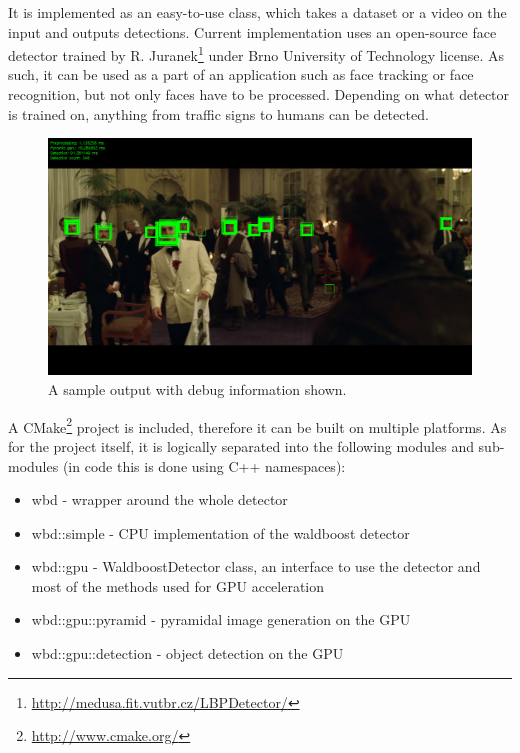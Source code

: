 It is implemented as an easy-to-use class, which takes a dataset or a video on the input and outputs detections. Current implementation uses an open-source face detector trained by R. Juranek\footnote{\url{http://medusa.fit.vutbr.cz/LBPDetector/}} under Brno University of Technology license. As such, it can be used as a part of an application such as face tracking or face recognition, but not only faces have to be processed. Depending on what detector is trained on, anything from traffic signs to humans can be detected.

\begin{center}
\begin{figure}[ht]
	\centering\includegraphics[width=\textwidth]{fig/sample.jpg}
	\caption{A sample output with debug information shown.}
	\label{fig:sample}
\end{figure}
\end{center}

A CMake\footnote{\url{http://www.cmake.org/}} project is included, therefore it can be built on multiple platforms. As for the project itself, it is logically separated into the following modules and sub-modules (in code this is done using C++ namespaces):

\begin{itemize}
	\item wbd - wrapper around the whole detector
	\item wbd::simple - CPU implementation of the waldboost detector
	\item wbd::gpu - WaldboostDetector class, an interface to use the detector and most of the methods used for GPU acceleration
	\item wbd::gpu::pyramid - pyramidal image generation on the GPU
	\item wbd::gpu::detection - object detection on the GPU
\end{itemize}

